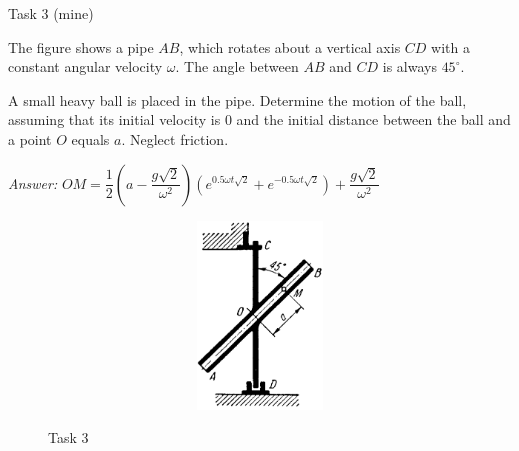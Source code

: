 \documentclass[aspectratio=169]{beamer}
\begin{document}
\begin{frame}[t]{Task 3 (mine)}
    \begin{minipage}{0.69\textwidth}
        The figure shows a pipe $AB$, which rotates about a vertical axis $CD$ with a constant angular velocity $\omega$. The angle between $AB$ and $CD$ is always $45^\circ$.

        A small heavy ball is placed in the pipe. Determine the motion of the ball, assuming that its initial velocity is $0$ and the initial distance between the ball and a point $O$ equals $a$. Neglect friction. \bigskip

        \textit{Answer:} $OM=\dfrac{1}{2}(a-\dfrac{g\sqrt{2}}{\omega^2})(e^{0.5\omega t \sqrt{2}} + e^{-0.5\omega t \sqrt{2}}) + \dfrac{g\sqrt{2}}{\omega^2}$

    \end{minipage}
    \begin{minipage}{0.29\textwidth}
        \begin{figure}[H]
            \includegraphics[height=5cm,width=1\textwidth,keepaspectratio]{lab9_task2_fig.png}\\
            \caption*{Task 3}
        \end{figure}
    \end{minipage}

\end{frame}
\end{document}
